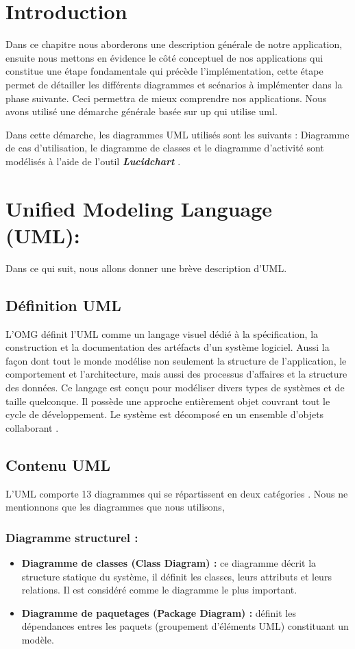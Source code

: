  \section*{Introduction}

  
Dans ce chapitre nous aborderons une description générale de notre application, ensuite nous mettons en évidence le côté conceptuel de nos applications qui constitue une étape fondamentale qui précède l’implémentation, cette étape permet de détailler les différents diagrammes et scénarios à implémenter dans la phase suivante. Ceci permettra de mieux comprendre nos applications. Nous avons utilisé une démarche générale basée sur \ac{up} qui utilise  \ac{uml}. 

Dans cette démarche, les diagrammes UML utilisés sont les suivants : Diagramme de cas d’utilisation, le diagramme de classes et le diagramme d'activité sont modélisés à l’aide de l’outil \textit{\textbf{Lucidchart}} .



 \section{Unified Modeling Language (UML):}
 Dans ce qui suit, nous allons donner une brève description d’UML.
 \subsection{ Définition UML }
 L’OMG définit l’UML comme un langage visuel dédié à la spécification, la construction et la documentation des artéfacts d’un système logiciel. Aussi la façon dont tout le monde modélise non seulement la structure de l’application, le comportement et l’architecture, mais aussi des processus d’affaires et la structure des données. Ce langage est conçu pour modéliser divers types de systèmes et de taille quelconque. Il possède une approche entièrement objet couvrant tout le cycle de développement. Le système est décomposé en un ensemble d’objets collaborant \parencite{uml}.
 
 \subsection{Contenu UML}
 
 L’UML comporte 13 diagrammes qui se répartissent en deux catégories \parencite{uml}. Nous ne mentionnons que les diagrammes que nous utilisons, 
 
 \subsubsection{Diagramme structurel : }
 \begin{itemize}
 \item \textbf{Diagramme de classes (Class Diagram) : }ce diagramme décrit la structure statique du système, il définit les classes, leurs attributs et leurs relations. Il est considéré comme le diagramme le plus important.
  \item  \textbf{Diagramme de paquetages (Package Diagram) : }définit les dépendances entres les paquets (groupement d’éléments UML) constituant un modèle. 
 \end{itemize}
 
